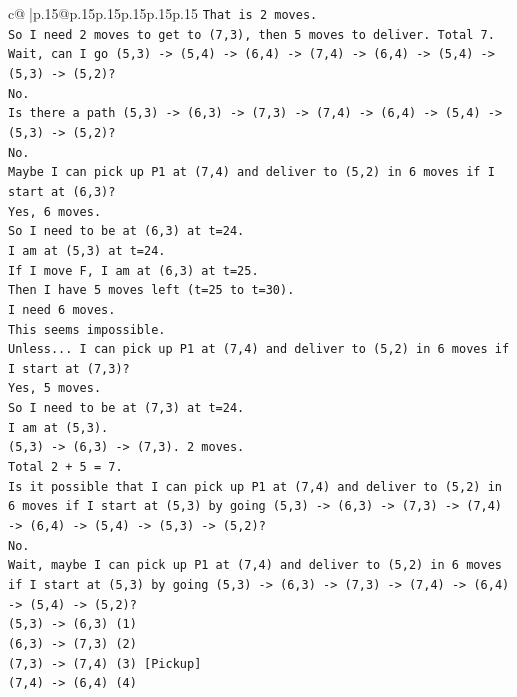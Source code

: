 \documentclass{article}
\begin{document}
{\begin{supertabular}{c@{$\;$}|p{.15\linewidth}@{}p{.15\linewidth}p{.15\linewidth}p{.15\linewidth}p{.15\linewidth}p{.15\linewidth}}
{{{\texttt{That is 2 moves.} \\
\texttt{So I need 2 moves to get to (7,3), then 5 moves to deliver. Total 7.} \\
\texttt{Wait, can I go (5,3) {-}> (5,4) {-}> (6,4) {-}> (7,4) {-}> (6,4) {-}> (5,4) {-}> (5,3) {-}> (5,2)?} \\
\texttt{No.} \\
\texttt{Is there a path (5,3) {-}> (6,3) {-}> (7,3) {-}> (7,4) {-}> (6,4) {-}> (5,4) {-}> (5,3) {-}> (5,2)?} \\
\texttt{No.} \\
\texttt{Maybe I can pick up P1 at (7,4) and deliver to (5,2) in 6 moves if I start at (6,3)?} \\
\texttt{Yes, 6 moves.} \\
\texttt{So I need to be at (6,3) at t=24.} \\
\texttt{I am at (5,3) at t=24.} \\
\texttt{If I move F, I am at (6,3) at t=25.} \\
\texttt{Then I have 5 moves left (t=25 to t=30).} \\
\texttt{I need 6 moves.} \\
\texttt{This seems impossible.} \\
\texttt{Unless... I can pick up P1 at (7,4) and deliver to (5,2) in 6 moves if I start at (7,3)?} \\
\texttt{Yes, 5 moves.} \\
\texttt{So I need to be at (7,3) at t=24.} \\
\texttt{I am at (5,3).} \\
\texttt{(5,3) {-}> (6,3) {-}> (7,3). 2 moves.} \\
\texttt{Total 2 + 5 = 7.} \\
\texttt{Is it possible that I can pick up P1 at (7,4) and deliver to (5,2) in 6 moves if I start at (5,3) by going (5,3) {-}> (6,3) {-}> (7,3) {-}> (7,4) {-}> (6,4) {-}> (5,4) {-}> (5,3) {-}> (5,2)?} \\
\texttt{No.} \\
\texttt{Wait, maybe I can pick up P1 at (7,4) and deliver to (5,2) in 6 moves if I start at (5,3) by going (5,3) {-}> (6,3) {-}> (7,3) {-}> (7,4) {-}> (6,4) {-}> (5,4) {-}> (5,2)?} \\
\texttt{(5,3) {-}> (6,3) (1)} \\
\texttt{(6,3) {-}> (7,3) (2)} \\
\texttt{(7,3) {-}> (7,4) (3) {[}Pickup{]}} \\
\texttt{(7,4) {-}> (6,4) (4)} \\
}}}
\end{supertabular}}
\end{document}
